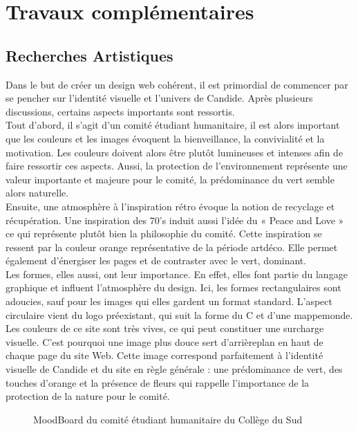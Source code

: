 \documentclass[a4,10pt,french]{sphinxmanual}
\begin{document}
\section{Travaux complémentaires}
\label{\detokenize{chapitre-06:travaux-complementaires}}

\subsection{Recherches Artistiques}
\label{\detokenize{chapitre-06:recherches-artistiques}}
\sphinxAtStartPar
Dans le but de créer un design web cohérent, il est primordial de commencer par se pencher sur l’identité visuelle et l’univers de Candide. Après plusieurs discussions, certains aspects importants sont ressortis.\\
Tout d’abord, il s’agit d’un comité étudiant humanitaire, il est alors important que les couleurs et les images évoquent la bienveillance, la convivialité et la motivation. Les couleurs doivent alors être plutôt lumineuses et intenses afin de faire ressortir ces aspects. Aussi, la protection de l’environnement représente une valeur importante et majeure pour le comité, la prédominance du vert semble alors naturelle.\\
Ensuite, une atmosphère à l’inspiration rétro évoque la notion de recyclage et récupération. Une inspiration des 70’s induit aussi l’idée du « Peace and Love » ce qui représente plutôt bien la philosophie du comité. Cette inspiration se ressent par la couleur orange représentative de la période art\sphinxhyphen{}déco. Elle permet également d’énergiser les pages et de contraster avec le vert, dominant.\\
Les formes, elles aussi, ont leur importance. En effet, elles font partie du langage graphique et influent l’atmosphère du design. Ici, les formes rectangulaires sont adoucies, sauf pour les images qui elles gardent un format standard. L’aspect circulaire vient du logo préexistant, qui suit la forme du C et d’une mappemonde.\\
Les couleurs de ce site sont très vives, ce qui peut constituer une surcharge visuelle. C’est pourquoi une image plus douce sert d’arrière\sphinxhyphen{}plan en haut de chaque page du site Web. Cette image correspond parfaitement à l’identité visuelle de Candide et du site en règle générale : une prédominance de vert, des touches d’orange et la présence de fleurs qui rappelle l’importance de la protection de la nature pour le comité.

\begin{figure}[htbp]
\centering
\capstart

\noindent{}
\caption{MoodBoard du comité étudiant humanitaire du Collège du Sud}\label{\detokenize{chapitre-06:id1}}\end{figure}
\end{document}
